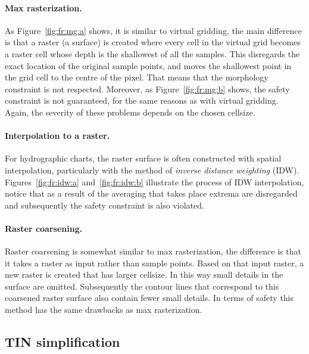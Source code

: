 %
\paragraph{Max rasterization.}
As Figure~\ref{fig:fr:mg:a} shows, it is similar to virtual gridding, the main difference is that a raster (a surface) is created where every cell in the virtual grid becomes a raster cell whose depth is the shallowest of all the samples.
This disregards the exact location of the original sample points, and moves the shallowest point in the grid cell to the centre of the pixel. 
That means that the morphology constraint is not respected.
Moreover, as Figure~\ref{fig:fr:mg:b} shows, the safety constraint is not guaranteed, for the same reasons as with virtual gridding.
Again, the severity of these problems depends on the chosen cellsize.

%
\paragraph{Interpolation to a raster.}
For hydrographic charts, the raster surface is often constructed with spatial interpolation, particularly with the method of \emph{inverse distance weighting} (IDW).
Figures~\ref{fig:fr:idw:a} and~\ref{fig:fr:idw:b} illustrate the process of IDW interpolation, notice that as a result of the averaging that takes place extrema are disregarded and subsequently the safety constraint is also violated. 

%
\paragraph{Raster coarsening.}
Raster coarsening is somewhat similar to max rasterization, the difference is that it takes a raster as input rather than sample points. 
Based on that input raster, a new raster is created that has larger cellsize. 
In this way small details in the surface are omitted. Subsequently the contour lines that correspond to this coarsened raster surface also contain fewer small details. 
In terms of safety this method has the same drawbacks as max rasterization.



\subsection{TIN simplification}
  
